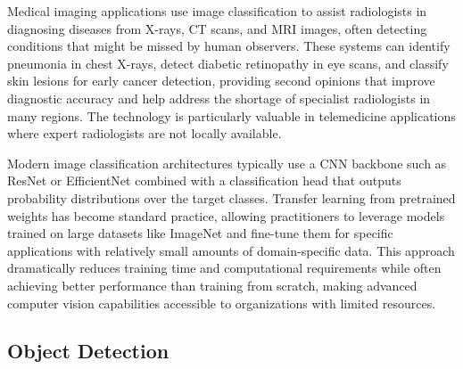 Medical imaging applications use image classification to assist radiologists in diagnosing diseases from X-rays, CT scans, and MRI images, often detecting conditions that might be missed by human observers. These systems can identify pneumonia in chest X-rays, detect diabetic retinopathy in eye scans, and classify skin lesions for early cancer detection, providing second opinions that improve diagnostic accuracy and help address the shortage of specialist radiologists in many regions. The technology is particularly valuable in telemedicine applications where expert radiologists are not locally available.

Modern image classification architectures typically use a CNN backbone such as ResNet or EfficientNet combined with a classification head that outputs probability distributions over the target classes. Transfer learning from pretrained weights has become standard practice, allowing practitioners to leverage models trained on large datasets like ImageNet and fine-tune them for specific applications with relatively small amounts of domain-specific data. This approach dramatically reduces training time and computational requirements while often achieving better performance than training from scratch, making advanced computer vision capabilities accessible to organizations with limited resources.


\subsection{Object Detection}

